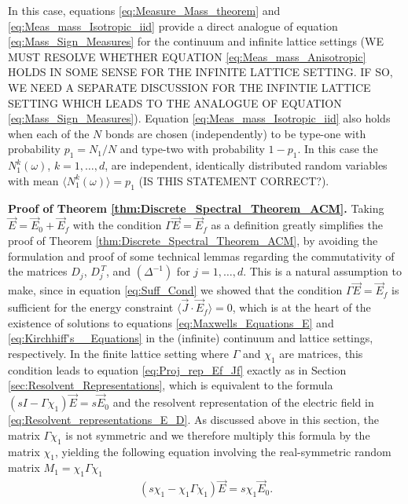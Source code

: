 \documentclass{cmslatex}
\begin{document}
%
In this case, equations \eqref{eq:Measure_Mass_theorem} and
\eqref{eq:Meas_mass_Isotropic_iid} provide a direct
analogue of equation \eqref{eq:Mass_Sign_Measures} for the continuum
and infinite lattice settings (WE MUST RESOLVE WHETHER EQUATION
\eqref{eq:Meas_mass_Anisotropic} HOLDS IN SOME SENSE FOR THE INFINITE
LATTICE SETTING. IF SO, WE NEED A SEPARATE DISCUSSION FOR THE INFINTIE
LATTICE SETTING WHICH LEADS TO THE ANALOGUE OF EQUATION
\eqref{eq:Mass_Sign_Measures}). Equation
\eqref{eq:Meas_mass_Isotropic_iid} also holds when each of the $N$ 
bonds are chosen (independently) to be type-one with probability
$p_1=N_1/N$ and type-two with probability $1-p_1$. In this case the
$N_1^k(\omega)$, $k=1,\ldots,d$, are independent, identically distributed random 
variables with mean $\langle N_1^k(\omega)\rangle=p_1$ (IS THIS STATEMENT CORRECT?).

\indent
\textbf{Proof of Theorem \ref{thm:Discrete_Spectral_Theorem_ACM}.}
Taking $\vec{E}=\vec{E}_0+\vec{E}_f$ with the 
condition $\Gamma\vec{E}=\vec{E}_f$ as a definition greatly simplifies the
proof of Theorem \ref{thm:Discrete_Spectral_Theorem_ACM}, by avoiding
the formulation and proof of some technical lemmas regarding the
commutativity of the matrices $D_j$, $D_j^{\,T}$, and $(\Delta^{-1})$ for
$j=1,\ldots,d$. This is a natural assumption to make, since in equation 
\eqref{eq:Suff_Cond} we showed that the condition $\Gamma\vec{E}=\vec{E}_f$
is sufficient for the energy constraint $\langle\vec{J}\cdot\vec{E}_f\rangle=0$, which
is at the heart of the existence of solutions to equations
\eqref{eq:Maxwells_Equations_E} and \eqref{eq:Kirchhiff's__Equations}
in the (infinite) continuum and lattice settings,
respectively. In the finite lattice setting where $\Gamma$ and $\chi_1$ are
matrices, this condition leads to equation \eqref{eq:Proj_rep_Ef_Jf}
exactly as in Section \eqref{sec:Resolvent_Representations}, which is
equivalent to the formula $(sI-\Gamma\chi_1)\vec{E}=s\vec{E}_0$  and the  
resolvent representation of the electric field in
\eqref{eq:Resolvent_representations_E_D}. As discussed above in this
section, the matrix $\Gamma\chi_1$ is not symmetric and we therefore multiply
this formula by the matrix $\chi_1$, yielding the following equation
involving the real-symmetric random matrix $M_1=\chi_1\Gamma\chi_1$ 
%
\begin{align}\label{eq:Discrete_Resolvent}
  (s\chi_1-\chi_1\Gamma\chi_1)\vec{E}=s\chi_1\vec{E}_0.
\end{align}
%
\end{document}
